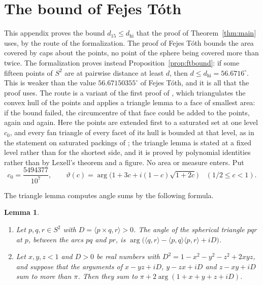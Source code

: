 \documentclass[12pt]{amsart}
\newtheorem{lemma}[theorem]{Lemma}
\theoremstyle{definition}
\theoremstyle{plain}
\theoremstyle{definition}
\newcommand{\Sph}{S^2}
\newcommand{\dhi}{d_{\mathrm{hi}}}
\newcommand{\leanmap}[1]{\ignorespaces}
\begin{document}
\section{The bound of Fejes T\'oth}\label{sec:leanft}
This appendix proves the bound $d_{15}\le\dhi$ that the proof of Theorem~\ref{thm:main} uses, by the route of the formalization. The proof of Fejes T\'oth \cite{FT43} bounds the area covered by caps about the points, no point of the sphere being covered more than twice. The formalization proves instead Proposition~\ref{prop:ftbound}: if some fifteen points of $\Sph$ are at pairwise distance at least $d$, then $d\le\dhi=56.6716^\circ$. This is weaker than the value $56.67150355^\circ$ of Fejes T\'oth, and it is all that the proof uses. The route is a variant of the first proof of \cite[Section~5.2, pp.~118 and~119]{FTK}, which triangulates the convex hull of the points and applies a triangle lemma to a face of smallest area: if the bound failed, the circumcentre of that face could be added to the points, again and again. Here the points are extended first to a saturated set at one level $c_0$, and every fan triangle of every facet of its hull is bounded at that level, as in the statement on saturated packings of \cite[Section~5.13, p.~155]{FTK}; the triangle lemma is stated at a fixed level rather than for the shortest side, and it is proved by polynomial identities rather than by Lexell's theorem and a figure. No area or measure enters. Put
\[
c_0=\frac{5494377}{10^7},\qquad \vartheta(c)=\arg\bigl(1+3c+i(1-c)\sqrt{1+2c}\bigr)\quad(1/2\le c<1).
\]

The triangle lemma computes angle sums by the following formula.

\begin{lemma}\label{lem:anglesum}\leanmap{Tammes15.FejesToth.sphereVertexAngle_eq_arg, Tammes15.FejesToth.angle_sum_arg}
\begin{enumerate}
\item Let $p,q,r\in\Sph$ with $D=\langle p\times q,r\rangle>0$. The angle of the spherical triangle $pqr$ at $p$, between the arcs $pq$ and $pr$, is $\arg\bigl(\langle q,r\rangle-\langle p,q\rangle\langle p,r\rangle+iD\bigr)$.
\item Let $x,y,z<1$ and $D>0$ be real numbers with $D^2=1-x^2-y^2-z^2+2xyz$, and suppose that the arguments of $x-yz+iD$, $y-zx+iD$ and $z-xy+iD$ sum to more than $\pi$. Then they sum to $\pi+2\arg(1+x+y+z+iD)$.
\end{enumerate}
\end{lemma}
\end{document}
